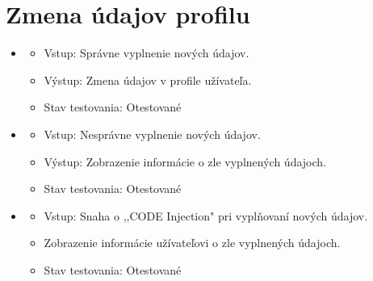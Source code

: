 \documentclass[12pt,a4paper]{report}
\theoremstyle{definition}
\theoremstyle{remark}
\begin{document}
\section{Zmena údajov profilu}
\begin{itemize}

	\item\begin{itemize}
	\item Vstup: Správne vyplnenie nových údajov.
	\item Výstup: Zmena údajov v profile užívateľa.
	\item Stav testovania: Otestované
	\end{itemize}
	
	\item\begin{itemize}
	\item Vstup: Nesprávne vyplnenie nových údajov.
	\item Výstup: Zobrazenie informácie o zle vyplnených údajoch.
	\item Stav testovania: Otestované
	\end{itemize}
	
	
	\item\begin{itemize}
	\item Vstup: Snaha o ,,CODE Injection" pri vyplňovaní nových údajov.
	\item Zobrazenie informácie užívateľovi o zle vyplnených údajoch.
	\item Stav testovania: Otestované
	\end{itemize}
	
\end{itemize}
\end{document}
